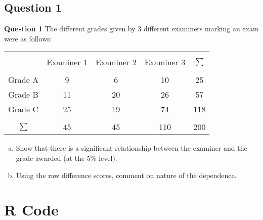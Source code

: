 \documentclass[compress]{beamer}        %
\makeatletter
\newcommand{\tcb}{\textcolor{beamer@blendedblue}}
\makeatother
\begin{document}
\subsection{Question 1}
\begin{frame}{\bf \tcb{Question 1}}
The different grades given by 3 different examiners marking an exam were as follows:
\begin{center}
\begin{tabular}{|c|ccc|c|}
\hline
&&&&\\[-0.3cm]
                    & Examiner 1 & Examiner 2 & Examiner 3 & $\sum$ \\[0.1cm]
\hline
&&&&\\[-0.3cm]
Grade A     &   9       &   6       &  10       &  25 \\[0.2cm]
Grade B     &  11       &  20       &  26       &  57 \\[0.2cm]
Grade C     &  25       &  19       &  74       & 118 \\[0.1cm]
\hline
&&&&\\[-0.3cm]
$\sum$        & 45 & 45 & 110 & 200  \\[0.1cm]
\hline
\end{tabular}
\end{center}

\begin{enumerate}[a)]\itemsep0.3cm
\item Show that there is a significant relationship between the examiner and the grade awarded (at the 5\% level).
\item Using the raw difference scores, comment on nature of the dependence.
\end{enumerate}


\end{frame}





\section{R Code}
\end{document}
